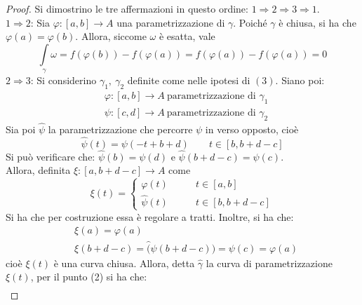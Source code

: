 \begin{proof}
    Si dimostrino le tre affermazioni in questo ordine: $1 \Rightarrow 2 \Rightarrow 3 \Rightarrow 1$.\\
    $1 \Rightarrow 2$: Sia $\varphi: [a,b] \to A$ una parametrizzazione di $\gamma$. Poiché $\gamma$ è chiusa, si ha che $\varphi(a)=\varphi(b)$. Allora, siccome $\omega$ è esatta, vale 
    \begin{equation}
        \int\limits_{\gamma}{\omega} = f(\varphi(b))- f(\varphi(a)) = f(\varphi(a))-f(\varphi(a))=0
    \end{equation}
    $2 \Rightarrow 3$: Si considerino $\gamma_1,\ \gamma_2$ definite come nelle ipotesi di $(3)$. Siano poi:
    \begin{equation}
        \begin{aligned}
            &\varphi: [a,b] \to A \ \text{parametrizzazione di } \gamma_1\\
            &\psi:[c, d] \to A \ \text{parametrizzazione di } \gamma_2
        \end{aligned}
    \end{equation}
    Sia poi $\hat{\psi}$ la parametrizzazione che percorre $\psi$ in verso opposto, cioè
    \begin{equation}
        \hat{\psi}(t)= \psi(-t+b+d) \qquad t \in [b, b+d-c]
    \end{equation}
Si può verificare che: $\hat{\psi}(b)= \psi(d)$ e $\hat{\psi}(b+d-c)=\psi(c)$.\\
Allora, definita $\xi: [a, b+d-c] \to A$ come
\begin{equation}
    \xi(t)= \begin{cases}
        \varphi(t) \qquad & t \in [a,b]\\
        \hat{\psi}(t) \qquad & t \in [b, b+d-c]
    \end{cases}
\end{equation}
Si ha che per costruzione essa è regolare a tratti. Inoltre, si ha che:
\begin{equation}
\begin{aligned}
    &\xi(a)= \varphi(a)\\
    &\xi(b+d-c)= \hat(\psi(b+d-c))=\psi(c)=\varphi(a)
\end{aligned}
\end{equation}
cioè $\xi(t)$ è una curva chiusa. Allora, detta $\hat{\gamma}$ la curva di parametrizzazione $\xi(t)$, per il punto (2) si ha che:
\begin{equation}
\begin{aligned}

\end{aligned}
\end{equation}
\end{proof}
